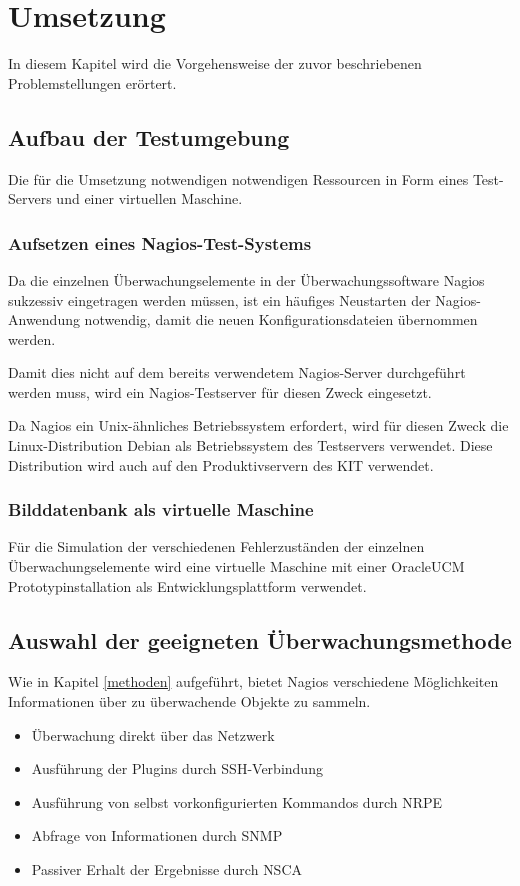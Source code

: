 \section{Umsetzung}
In diesem Kapitel wird die Vorgehensweise der zuvor beschriebenen Problemstellungen erörtert.

\subsection{Aufbau der Testumgebung}

Die für die Umsetzung notwendigen notwendigen Ressourcen in Form eines Test-Servers und einer virtuellen Maschine.

\subsubsection{Aufsetzen eines Nagios-Test-Systems}
Da die einzelnen Überwachungselemente in der Überwachungssoftware Nagios sukzessiv eingetragen werden müssen, ist ein häufiges Neustarten der Nagios-Anwendung notwendig, damit die neuen Konfigurationsdateien übernommen werden.

Damit dies nicht auf dem bereits verwendetem Nagios-Server durchgeführt werden muss, wird ein Nagios-Testserver für diesen Zweck eingesetzt.

Da Nagios ein Unix-ähnliches Betriebssystem erfordert, wird für diesen Zweck die Linux-Distribution Debian als Betriebssystem des Testservers verwendet.
Diese Distribution wird auch auf den Produktivservern des KIT verwendet.

\subsubsection{Bilddatenbank als virtuelle Maschine}
Für die Simulation der verschiedenen Fehlerzuständen der einzelnen Überwachungselemente wird eine virtuelle Maschine mit einer \gls{OracleUCM} Prototypinstallation  als Entwicklungsplattform verwendet.

\subsection{Auswahl der geeigneten Überwachungsmethode}
\label{sectunixagents}
Wie in Kapitel \ref{methoden} aufgeführt, bietet Nagios verschiedene Möglichkeiten Informationen über zu überwachende Objekte zu sammeln.

\begin{itemize}
\item Überwachung direkt über das Netzwerk
\item Ausführung der Plugins durch \gls{SSH}-Verbindung
\item Ausführung von selbst vorkonfigurierten Kommandos durch \gls{NRPE}
\item Abfrage von Informationen durch \gls{SNMP}
\item Passiver Erhalt der Ergebnisse durch \gls{NSCA}
\end{itemize}

